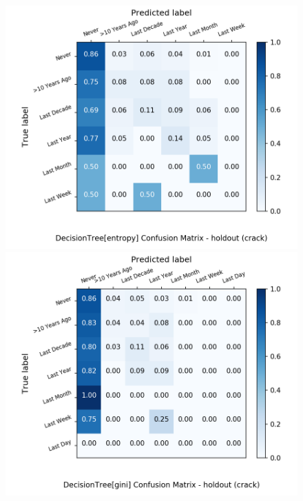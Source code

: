 \begin{figure}[H]
	\centering
	\begin{minipage}[b]{0.32\textwidth}
		\includegraphics[width=1.1\textwidth]{Plots/crack_DecisionTree_entropy_balance_False_holdout.png}
	\end{minipage}
	\begin{minipage}[b]{0.32\textwidth}
		\includegraphics[width=1.1\textwidth]{Plots/crack_DecisionTree_gini_balance_False_holdout.png}
	\end{minipage}
	\begin{minipage}[b]{0.32\textwidth}

\end{minipage}
\end{figure}
